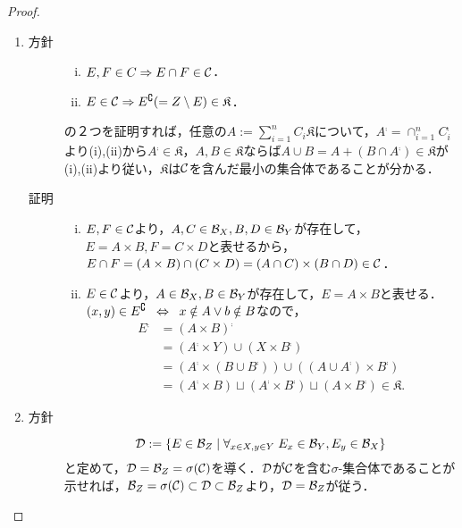 \documentclass[uplatex, dvipdfmx]{jsreport}
\begin{document}
\begin{proof}\mbox{}
    \begin{enumerate}
        \item \begin{description}
            \item[方針] \begin{enumerate}[(i)]
                \item $E,F\in C\Rightarrow E\cap F\in\mathcal{C}$．
                \item $E\in\mathcal{C}\Rightarrow E^\complement(=Z\setminus E)\in\mathfrak{K}$．
            \end{enumerate}
            の２つを証明すれば，任意の$A:=\sum_{i=1}^nC_i\mathfrak{K}$について，$A^\comp=\cap_{i=1}^nC_i^\comp$より(i),(ii)から$A^\comp\in\mathfrak{K}$，$A,B\in\mathfrak{K}$ならば$A\cup B=A+(B\cap A^\comp)\in\mathfrak{K}$が(i),(ii)より従い，$\mathfrak{K}$は$\mathcal{C}$を含んだ最小の集合体であることが分かる．
            \item[証明] \begin{enumerate}[(i)]
                \item $E,F\in\mathcal{C}$より，$A,C\in\mathcal{B}_X,B,D\in\mathcal{B}_Y$が存在して，$E=A\times B,F=C\times D$と表せるから，$E\cap F=(A\times B)\cap(C\times D)=(A\cap C)\times(B\cap D)\in\mathcal{C}$．
                \item $E\in\mathcal{C}$より，$A\in\mathcal{B}_X,B\in\mathcal{B}_Y$が存在して，$E=A\times B$と表せる．$(x,y)\in E^\complement\;\;\Leftrightarrow\;\; x\notin A\lor b\notin B$なので，
                \begin{align*}
                    E^\comp&=(A\times B)^\comp\\
                    &=(A^\comp\times Y)\cup(X\times B^\comp)\\
                    &=(A^\comp\times(B\cup B^\comp))\cup((A\cup A^\comp)\times B^\comp)\\
                    &=(A^\comp\times B)\sqcup(A^\comp\times B^\comp)\sqcup(A\times B^\comp)\in\mathfrak{K}.
                \end{align*}
            \end{enumerate}
        \end{description}
        \item 
        \begin{description}
            \item[方針] \[\mathcal{D}:=\left\{E\in\mathcal{B}_Z\;\middle|\;\forall_{x\in X,y\in Y}\;E_x\in\mathcal{B}_Y,E_y\in\mathcal{B}_X\right\}\]
            と定めて，$\mathcal{D}=\mathcal{B}_Z=\sigma(\mathcal{C})$を導く．$\mathcal{D}$が$\mathcal{C}$を含む$\sigma$-集合体であることが示せれば，$\mathcal{B}_Z=\sigma(\mathcal{C})\subset\mathcal{D}\subset\mathcal{B}_Z$より，$\mathcal{D}=\mathcal{B}_Z$が従う．

\end{description}
\end{enumerate}
\end{proof}
\end{document}
